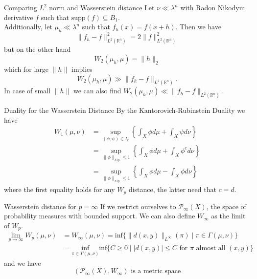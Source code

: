 \documentclass[10pt]{beamer}
\theoremstyle{reminder}
\begin{document}
\begin{frame}{Comparing $L^2$ norm and Wasserstein distance}
    Let $\nu \ll \lambda^n$ with Radon Nikodym derivative $f$ such that $\text{supp}(f) \subseteq \overline{B_1}$. \\ 
    \vspace{0.5cm}
        Additionally, let $\mu_h \ll \lambda^n$ such that $f_h(x) = f(x+h)$. Then we have $$\|f_h-f\|^2_{L^2(\mathbb{R}^n)} = 2\|f\|_{L^2(\mathbb{R}^n)}^2$$ but on the other hand $$W_2(\mu_h,\mu) = \|h\|_2$$ which for large $\|h\|$ implies $$W_2(\mu_h,\mu) \gg \|f_h-f\|_{L^2(\mathbb{R}^n)}.$$ In case of small $\|h\|$ we can also find $W_2(\mu_h,\mu) \ll \|f_h-f\|_{L^2(\mathbb{R}^n)}$.
\end{frame}

\begin{frame}{Duality for the Wasserstein Distance}
    By the Kantorovich-Rubinstein Duality we have \begin{align*} W_1(\mu,\nu) &= \sup_{(\phi,\psi) \in I_c} \left\{ \int_X \phi d\mu + \int_X \psi d\nu \right\} \\ &= \sup_{\|\phi\|_{Lip} \leq 1} \left\{\int_X \phi d\mu + \int_X \phi^c d\nu  \right\} 
       \\ &= \sup_{\|\phi\|_{Lip} \leq 1} \left\{\int_X \phi d\mu - \int_X \phi d\nu  \right\} \end{align*}
       where the first equality holds for any $W_p$ distance, the latter need that $c = d$.
\end{frame}


\begin{frame}{Wasserstein distance for $p = \infty$}
    If we restrict ourselves to $\mathcal{P}_\infty(X)$, the space of probability measures with bounded support. We can also define $W_\infty$ as the limit of $W_p$.
    \begin{align*}\lim_{p \to \infty} W_p(\mu,\nu) &= W_\infty(\mu,\nu) =\text{inf}\{\|d(x,y)\|_{L^\infty}(\pi) \mid \pi \in \Gamma(\mu,\nu)\} \\
    &= \underset{\pi \in \Gamma(\mu,\nu)}{\text{inf}}\text{inf}\{C \geq 0 \mid |d(x,y)| \leq C \text{ for } \pi \text{ almost all } (x,y)\} \end{align*} 
    and we have $$(\mathcal{P}_\infty(X), W_\infty) \text{ is a metric space}$$ 
\end{frame}



\end{document}
